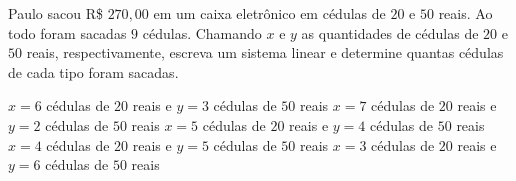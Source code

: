 Paulo sacou R\$ $270{,}00$ em um caixa eletrônico em cédulas de $20$ e $50$ reais. Ao todo foram sacadas $9$ cédulas. Chamando $x$ e $y$ as quantidades de cédulas de $20$ e $50$ reais, respectivamente, escreva um sistema linear e determine quantas cédulas de cada tipo foram sacadas.

$x=6$ cédulas de $20$ reais e $y=3$ cédulas de $50$ reais
$x=7$ cédulas de $20$ reais e $y=2$ cédulas de $50$ reais
$x=5$ cédulas de $20$ reais e $y=4$ cédulas de $50$ reais
$x=4$ cédulas de $20$ reais e $y=5$ cédulas de $50$ reais
$x=3$ cédulas de $20$ reais e $y=6$ cédulas de $50$ reais


